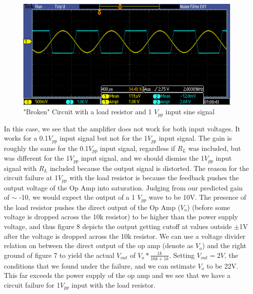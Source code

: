 \documentclass{article}
\begin{document}
    \begin{figure}[H]
        \centering
        \includegraphics[scale = 0.7]{6a.PNG}
        \caption{"Broken" Circuit with a load resistor and 1 $V_{pp}$ input sine signal}
        \label{fig:my_label}
    \end{figure}
    In this case, we see that the amplifier does not work for both input voltages. It works for a 0.1$V_{pp}$ input signal but not for the 1$V_{pp}$ input signal. The gain is roughly the same for the 0.1$V_{pp}$ input signal, regardless if $R_L$ was included, but was different for the 1$V_{pp}$ input signal, and we should dismiss the 1$V_{pp}$ input signal with $R_L$ included because the output signal is distorted. The reason for the circuit failure at 1$V_{pp}$ with the load resistor is because the feedback pushes the output voltage of the Op Amp into saturation. Judging from our predicted gain of $\sim$ -10, we would expect the output of a 1 $V_{pp}$ wave to be 10V. The presence of the load resistor pushes the direct output of the Op Amp ($V_o$) (before some voltage is dropped across the 10k resistor) to be higher than the power supply voltage, and thus figure 8 depicts the output getting cutoff at values outside $\pm$1V after the voltage is dropped across the 10k resistor. We can use a voltage divider relation on between the direct output of the op amp (denote as $V_o$) and the right ground of figure 7 to yield the actual $V_{out}$ of $V_o*\frac{1k}{10k + 1k}$. Setting $V_{out} = 2V$, the conditions that we found under the failure, and we can estimate $V_o$ to be 22V. This far exceeds the power supply of the op amp and we see that we have a circuit failure for 1$V_{pp}$ input with the load resistor. 
\end{document}
